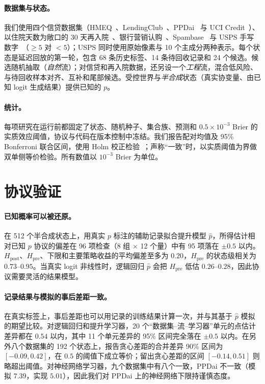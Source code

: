 \documentclass[runningheads]{llncs}
\newcommand{\Hpost}{H_{\mathrm{post}}}
\newcommand{\Hpre}{H_{\mathrm{pre}}}
\begin{document}
\paragraph{数据集与状态。}我们使用四个信贷数据集（HMEQ~\cite{sasHMEQ}、LendingClub~\cite{lendingclubSource}、PPDai~\cite{ppdaiSource,he2018ensemble} 与 UCI Credit~\cite{yeh2009comparison}）、以住院天数为敞口的 30 天再入院~\cite{strack2014impact}、银行营销认购~\cite{moro2014bank}、Spambase~\cite{hopkins1999spambase} 与 USPS 手写数字~\cite{hull1994usps}（$\ge5$ 对 $<5$）；USPS 同时使用原始像素与 10 个主成分两种表示。每个状态是延迟回放的第一轮，包含 68 条历史标签、14 条待回收记录和 24 个候选。候选随机抽取（\emph{自然}流）；对信贷和再入院数据，还另设一个\emph{工程}流，混合低风险、与待回收样本对齐、互补和尾部候选。受控世界与\emph{半合成}状态（真实协变量、由已知 logit 生成结果）提供已知的 $p$。

\paragraph{统计。}每项研究在运行前都固定了状态、随机种子、集合族、预测和 $0.5\times10^{-3}$ Brier 的实质效应阈值，协议与代码在版本控制中冻结。我们报告配对均值及 95\% Bonferroni 联合区间，使用 Holm 校正检验~\cite{holm1979simple}；声称“一致”时，以实质阈值为界做双单侧等价检验。所有数值以 $10^{-3}$ Brier 为单位。

\section{协议验证}
\label{sec:validation}
\paragraph{已知概率可以被还原。}在 512 个半合成状态上，用真实 $p$ 标注的辅助记录拟合提升模型 $\hat p$，所得估计相对已知 $p$ 协议的偏差在 96 项检查（8 组 $\times$ 12 个量）中有 95 项落在 $\pm0.5$ 以内。$\Hpost$、$\Hpre$、下限和主要策略收益的平均偏差至多为 $0.20$，$\Hpre$ 的状态级相关为 $0.73$--$0.95$。当真实 logit 非线性时，逻辑回归 $\hat p$ 会把 $\Hpre$ 低估 $0.26$--$0.28$，因此协议需要灵活的结果模型。

\paragraph{记录结果与模拟的事后差距一致。}在真实标签上，事后差距也可以用记录的训练结果计算一次，并与其基于 $\hat p$ 模拟的期望比较。对逻辑回归和提升学习器，20 个“数据集--流--学习器”单元的点估计差异都在 $0.54$ 以内，其中 11 个单元差异的 95\% 区间完全落在 $\pm0.5$ 以内。在另外八个数据集的 192 个状态上，报告贪心差距的合并差异 90\% 区间为 $[-0.09,0.42]$，在 $0.5$ 的阈值下成立等价；留出贪心差距的区间 $[-0.14,0.51]$ 则略超出阈值。对神经网络学习器，九个数据集中有八个一致，PPDai 不一致（模拟 $7.39$，实现 $5.01$），因此我们对 PPDai 上的神经网络下限持谨慎态度。
\end{document}
